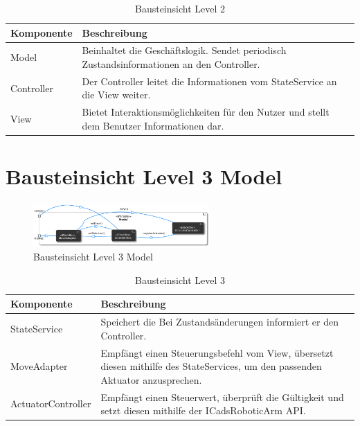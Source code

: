 \begin{table}[h!]
\centering
\begin{tabular}{|p{4cm}|p{9cm}|}
\hline
\textbf{Komponente} & \textbf{Beschreibung} \\ \hline
Model & Beinhaltet die Geschäftslogik. Sendet periodisch Zustandsinformationen an den Controller. \\ \hline
Controller &  Der Controller leitet die Informationen vom StateService an die View weiter. \\ \hline
View & Bietet Interaktionsmöglichkeiten für den Nutzer und stellt dem Benutzer Informationen dar. 
\end{tabular}
\caption{Bausteinsicht Level 2}
\label{tab:lvl2}
\end{table}
\newpage

\section{Bausteinsicht Level 3 Model}
\begin{figure}[h] %
    \centering
    \includegraphics[width=0.6\textwidth]{diagrams/baustein_lvl_3_model_v2.png}
    \caption{Bausteinsicht Level 3 Model}
\end{figure}

\begin{table}[h!]
\centering
\begin{tabular}{|p{4cm}|p{9cm}|}
\hline
\textbf{Komponente} & \textbf{Beschreibung} \\ \hline
StateService & Speichert die Bei Zustandsänderungen informiert er den Controller. \\ \hline
MoveAdapter  & Empfängt einen Steuerungsbefehl vom View, übersetzt diesen mithilfe des StateServices, um den passenden Aktuator anzusprechen. \\ \hline
ActuatorController & Empfängt einen Steuerwert, überprüft die Gültigkeit und setzt diesen mithilfe der ICadsRoboticArm API. \\ \hline
\end{tabular}
\caption{Bausteinsicht Level 3}
\label{tab:lvl3}
\end{table}

